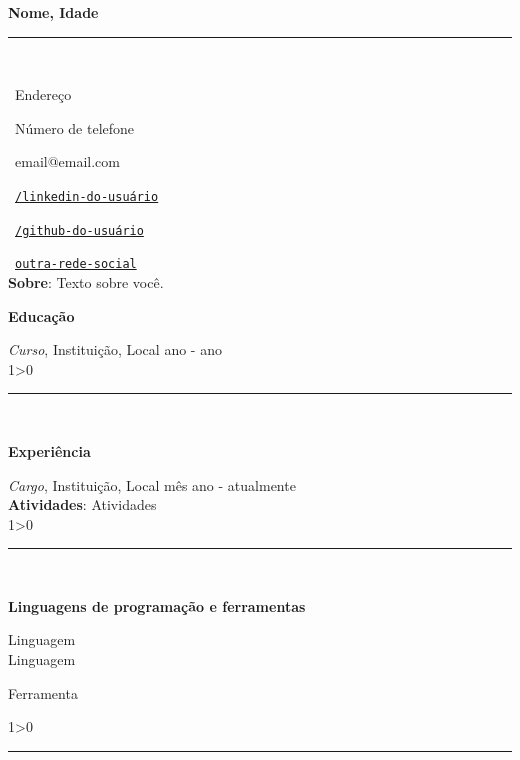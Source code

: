 \documentclass[a4paper,10pt]{article}
\makeatletter
\newcommand{\profissional}{Nome}
\newcommand{\idade}{Idade}
\newcommand{\Endereco}{Endereço}
\newcommand{\telefone}{Número de telefone}
\newcommand{\email}{email@email.com}
\newcommand{\sobre}{
    Texto sobre você.
    \vspace{3\baselineskip}
}
\newcommand{\criaSecao}[4][0]{
    \noindent
	\begin{minipage}{0.16\linewidth}
		\large{\textbf{#2}}
		\vspace{#3\baselineskip}
	\end{minipage}
	\hfill
	\begin{minipage}{0.79\linewidth}
		#4
		\ifnum0#1>0 { \hrule {\ } } \fi
	\end{minipage}
	\vspace{\baselineskip}
}
\makeatother
\begin{document}
	
	\noindent
	\hfill
	\begin{minipage}{0.65\linewidth}
		\Huge{\bf \profissional, \idade}\\\vspace{-1.75\baselineskip}
		
		\noindent\rule{\textwidth}{1.5pt} {\ }\\\vspace{-1.8\baselineskip}
		
		\large{
		\faMapMarker \ \Endereco \\
		\begin{minipage}{0.5\linewidth}
			\faWhatsapp \ \telefone
		\end{minipage}
		\begin{minipage}{0.5\linewidth}
			\faEnvelope \ \email
		\end{minipage}
		\begin{minipage}{0.5\linewidth}
			\faLinkedinSquare \ \href{https://www.linkedin.com}{\texttt{/linkedin-do-usuário}}
		\end{minipage}
		\begin{minipage}{0.5\linewidth}
			\faGithub \ \href{https://github.com}{\texttt{/github-do-usuário}}
		\end{minipage}
		\faLink \ \href{https://www.overleaf.com/}{\texttt{outra-rede-social}}\\
		\vfill
		\textbf{Sobre}:\sobre
		}
	\end{minipage}
	\vspace{\baselineskip}
	
    \criaSecao[1]{Educação}{1}{
		\textit{Curso}, Instituição, Local \hfill ano - ano \\
    }
    
    \criaSecao[1]{Experiência}{2}{
        \textit{Cargo}, Instituição, Local \hfill mês ano - atualmente \\
        \textbf{Atividades}: Atividades\\
    }
    
    \criaSecao[1]{Linguagens de programação e ferramentas}{2}{
        \large{\bf
			\begin{minipage}{0.33\linewidth}
				Linguagem\\
				Linguagem\\
				\vspace{\baselineskip}
			\end{minipage}
			\begin{minipage}{0.33\linewidth}
				Ferramenta\\
				\vspace{2\baselineskip}
			\end{minipage}
			\begin{minipage}{0.33\linewidth}
				\vspace{3\baselineskip}
			\end{minipage}
		}
    }
	
\end{document}
